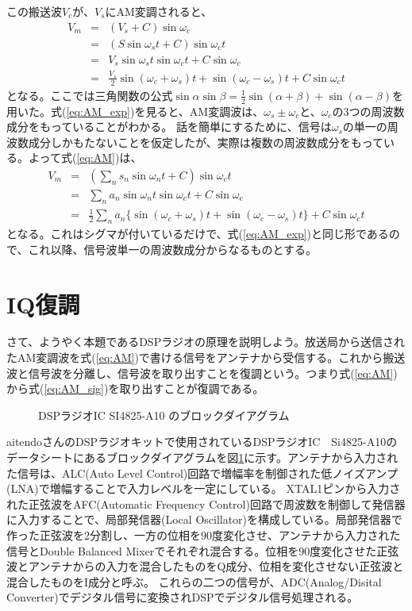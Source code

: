 この搬送波$V_c$が、$V_s$にAM変調されると、
\begin{eqnarray}
V_m &=& (V_s + C)\sin\omega_c \label{eq:AM}\\ 
&=&(S\sin\omega_s t + C)\sin\omega_c t \nonumber \\
&=& V_s\sin\omega_s t \sin\omega_c t + C\sin\omega_c \nonumber \\
&=& \frac{V_s}{2}{\sin(\omega_c + \omega_s)t + \sin(\omega_c - \omega_s)t} + C\sin\omega_ct \label{eq:AM_exp}
\end{eqnarray}
となる。ここでは三角関数の公式$\sin\alpha\sin\beta=\frac{1}{2}{\sin(\alpha+\beta)+\sin(\alpha-\beta)}$を用いた。式(\ref{eq:AM_exp})を見ると、AM変調波は、$\omega_s \pm \omega_c$と、$\omega_c$の3つの周波数成分をもっていることがわかる。
話を簡単にするために、信号は$\omega_s$の単一の周波数成分しかもたないことを仮定したが、実際は複数の周波数成分をもっている。よって式(\ref{eq:AM})は、
\begin{eqnarray}
V_m &=&  (\sum_n s_n\sin\omega_n t + C)\sin\omega_c t \nonumber \\
&=& \sum_n a_n\sin\omega_n t \sin\omega_c t + C\sin\omega_c \nonumber \\
&=& \frac{1}{2}\sum_n{a_n\{\sin(\omega_c + \omega_s)t + \sin(\omega_c - \omega_s)t}\} + C\sin\omega_ct \nonumber
\end{eqnarray}
となる。これはシグマが付いているだけで、式(\ref{eq:AM_exp})と同じ形であるので、これ以降、信号波単一の周波数成分からなるものとする。

\section*{IQ復調}
さて、ようやく本題であるDSPラジオの原理を説明しよう。放送局から送信されたAM変調波を式(\ref{eq:AM})で書ける信号をアンテナから受信する。これから搬送波と信号波を分離し、信号波を取り出すことを復調という。つまり式(\ref{eq:AM})から式(\ref{eq:AM_sig})を取り出すことが復調である。

\begin{figure}
\caption{DSPラジオIC SI4825-A10 のブロックダイアグラム}
\label{fig:block}
\end{figure}
aitendoさんのDSPラジオキットで使用されているDSPラジオIC　Si4825-A10のデータシートにあるブロックダイアグラムを図\ref{fig:block}に示す。アンテナから入力された信号は、ALC(Auto Level Control)回路で増幅率を制御された低ノイズアンプ(LNA)で増幅することで入力レベルを一定にしている。
XTAL1ピンから入力された正弦波をAFC(Automatic Frequency Control)回路で周波数を制御して発信器に入力することで、局部発信器(Local Oscillator)を構成している。局部発信器で作った正弦波を2分割し、一方の位相を90度変化させ、アンテナから入力された信号とDouble Balanced Mixerでそれぞれ混合する。位相を90度変化させた正弦波とアンテナからの入力を混合したものをQ成分、位相を変化させない正弦波と混合したものをI成分と呼ぶ。
これらの二つの信号が、ADC(Analog/Disital Converter)でデジタル信号に変換されDSPでデジタル信号処理される。

